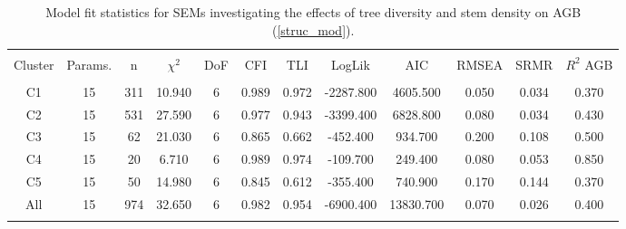 
\begin{table}[!htbp] \centering 
  \caption{Model fit statistics for SEMs investigating the effects of tree diversity and stem density on AGB (\autoref{struc_mod}).} 
  \label{struc_model_fit_clust_stats} 
\begin{tabular}{@{\extracolsep{0pt}} cccccccccccc} 
\\[-1.8ex]\hline 
\hline \\[-1.8ex] 
{Cluster} & {Params.} & {n} & {$\chi^{2}$} & {DoF} & {CFI} & {TLI} & {LogLik} & {AIC} & {RMSEA} & {SRMR} & {$R^{2}$ AGB} \\
\hline \\[-1.8ex] 
C1 & 15 & 311 & 10.940 & 6 & 0.989 & 0.972 & -2287.800 & 4605.500 & 0.050 & 0.034 & 0.370 \\ 
C2 & 15 & 531 & 27.590 & 6 & 0.977 & 0.943 & -3399.400 & 6828.800 & 0.080 & 0.034 & 0.430 \\ 
C3 & 15 & 62 & 21.030 & 6 & 0.865 & 0.662 & -452.400 & 934.700 & 0.200 & 0.108 & 0.500 \\ 
C4 & 15 & 20 & 6.710 & 6 & 0.989 & 0.974 & -109.700 & 249.400 & 0.080 & 0.053 & 0.850 \\ 
C5 & 15 & 50 & 14.980 & 6 & 0.845 & 0.612 & -355.400 & 740.900 & 0.170 & 0.144 & 0.370 \\ 
All & 15 & 974 & 32.650 & 6 & 0.982 & 0.954 & -6900.400 & 13830.700 & 0.070 & 0.026 & 0.400 \\ 
\hline \\[-1.8ex] 
\end{tabular} 
\end{table} 
